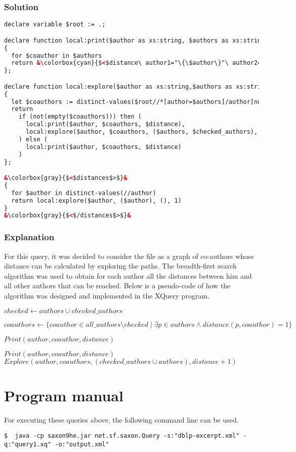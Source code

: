 \documentclass{article}
\begin{document}
\subsubsection{Solution}
\begin{lstlisting}[language=xml, frame=none, escapechar=&]
declare variable $root := .;

declare function local:print($author as xs:string, $authors as xs:string*, $distance as xs:integer)
{
  for $coauthor in $authors
  return &\colorbox{cyan}{$<$distance\ author1="\{\$author\}"\ author2="\{\$coauthor\}"\ distance="\{\$distance\}"/$>$}&
};

declare function local:explore($author as xs:string,$authors as xs:string*, $checked_authors as xs:string*, $distance as xs:integer)
{
  let $coauthors := distinct-values($root//*[author=$authors]/author[not(.=($authors,$checked_authors))])
  return
    if (not(empty($coauthors))) then (
      local:print($author, $coauthors, $distance),
      local:explore($author, $coauthors, ($authors, $checked_authors), $distance+1)
    ) else (
      local:print($author, $coauthors, $distance)
    )
};

&\colorbox{gray}{$<$distances$>$}&
{
  for $author in distinct-values(//author)
  return local:explore($author, ($author), (), 1)
}
&\colorbox{gray}{$<$/distances$>$}&
\end{lstlisting}
\subsubsection{Explanation}

For this query, it was decided to consider the file as a graph of co-authors whose distance can be calculated by exploring the paths. The breadth-first search algorithm was used to obtain for each author all the distances between him and all other authors that can be reached. Below is a pseudo-code of how the algorithm was designed and implemented in the XQuery program.

\begin{algorithm}[H]
\caption{$Explore(author, authors, checked\_authors, distance)$}
\begin{algorithmic}

\STATE $checked \gets authors \cup checked\_authors$

\STATE $coauthors \gets \{coauthor \in all\_authors \setminus checked \mid \exists p \in authors \wedge distance(p, coauthor) = 1\}$

        \STATE $Print(author, coauthor, distance)$
    \ENDFOR

\ELSE
        \STATE $Print(author, coauthor, distance)$
    \ENDFOR
    \STATE $Explore(author, coauthors, (checked\_authors \cup authors), distance + 1)$
\ENDIF

\end{algorithmic}
\end{algorithm}

\section{Program manual}

For executing these queries above, the following command line can be used.

\begin{lstlisting}[frame=lines]
    $  java -cp saxon9he.jar net.sf.saxon.Query -s:"dblp-excerpt.xml" -q:"query1.xq" -o:"output.xml"
\end{lstlisting}
\end{document}
